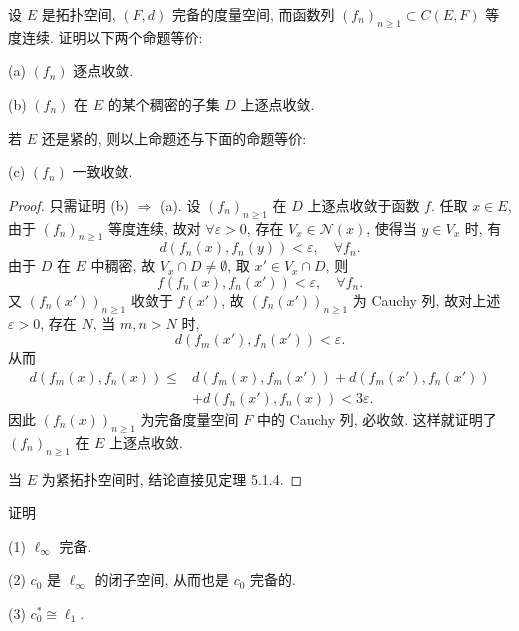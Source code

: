 \documentclass{mathexercise}
\begin{document}
\begin{exercise}
    设 $E$ 是拓扑空间, $(F, d)$ 完备的度量空间, 
    而函数列 $\left(f_{n}\right)_{n \geq 1} \subset C(E, F)$ 等度连续. 证明以下两个命题等价:

    (a) $\left(f_{n}\right)$ 逐点收敛.

    (b) $\left(f_{n}\right)$ 在 $E$ 的某个稠密的子集 $D$ 上逐点收敛. 
    
    若 $E$ 还是紧的, 则以上命题还与下面的命题等价:

    (c) $\left(f_{n}\right)$ 一致收敛.
\end{exercise}

\begin{proof}
    只需证明 (b) $\Rightarrow$ (a).
    设 $(f_n)_{n\geq 1}$ 在 $D$ 上逐点收敛于函数 $f$. 任取 $x\in E$,
    由于 $(f_n)_{n\geq 1}$ 等度连续, 故对 $\forall\varepsilon>0$,
    存在 $V_x\in\mathcal{N}(x)$, 使得当 $y\in V_x$ 时, 有
    \[d(f_n(x),f_n(y))<\varepsilon,\quad\forall f_n.\]
    由于 $D$ 在 $E$ 中稠密, 故 $V_x\cap D\neq\emptyset$,
    取 $x'\in V_x\cap D$, 则
    \[f(f_n(x),f_n(x'))<\varepsilon,\quad\forall f_n.\]
    又 $(f_n(x'))_{n\geq 1}$ 收敛于 $f(x')$, 故 $(f_n(x'))_{n\geq 1}$ 为 Cauchy 列,
    故对上述 $\varepsilon>0$, 存在 $N$, 当 $m,n>N$ 时,
    \[d(f_m(x'),f_n(x'))<\varepsilon.\]
    从而
    \begin{align*}
        d(f_m(x),f_n(x))
         \leq{} & d(f_m(x),f_m(x'))+d(f_m(x'),f_n(x')) \\
                & +d(f_n(x'),f_n(x))<3\varepsilon.
    \end{align*}
    因此 $(f_n(x))_{n\geq 1}$ 为完备度量空间 $F$ 中的 Cauchy 列, 必收敛.
    这样就证明了 $(f_n)_{n\geq 1}$ 在 $E$ 上逐点收敛.

    当 $E$ 为紧拓扑空间时, 结论直接见定理 5.1.4.
\end{proof}



\begin{exercise}
    证明

    (1) $\ell_{\infty}$ 完备.

    (2) $c_0$ 是 $\ell_{\infty}$ 的闭子空间, 从而也是 $c_0$ 完备的.

    (3) $c_0^{*}\cong\ell_{1}$.
\end{exercise}
\end{document}
